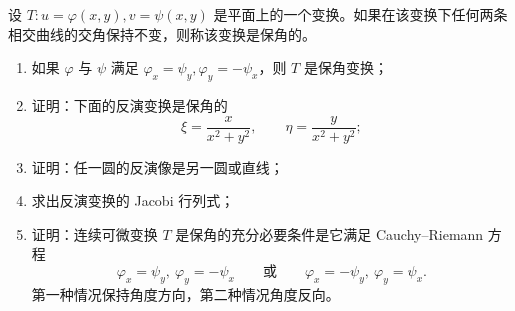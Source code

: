 \begin{xreferenceproblem}[7]
设 $T:u=\varphi(x,y),v=\psi(x,y)$ 是平面上的一个变换。如果在该变换下任何两条相交曲线的交角保持不变，则称该变换是保角的。
  \begin{enumerate}[label=(\arabic*)]
    \item 如果 $\varphi$ 与 $\psi$ 满足 $\varphi_x=\psi_y,\varphi_y=-\psi_x$，则 $T$ 是保角变换；
    \item 证明：下面的反演变换是保角的
    \[
      \xi=\frac{x}{x^2+y^2},\qquad
      \eta=\frac{y}{x^2+y^2};
    \]
    \item 证明：任一圆的反演像是另一圆或直线；
    \item 求出反演变换的 Jacobi 行列式；
    \item 证明：连续可微变换 $T$ 是保角的充分必要条件是它满足 Cauchy--Riemann 方程
    \[
      \varphi_x=\psi_y,\ \varphi_y=-\psi_x
      \qquad\text{或}\qquad
      \varphi_x=-\psi_y,\ \varphi_y=\psi_x.
    \]
    第一种情况保持角度方向，第二种情况角度反向。
  \end{enumerate}
\end{xreferenceproblem}
